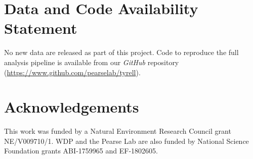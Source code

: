 \documentclass[12pt,english,a4paper]{article}
\begin{document}
\clearpage






\section*{Data and Code Availability Statement}

No new data are released as part of this project. Code to reproduce the full analysis pipeline is available from our \emph{GitHub} repository (\url{https://www.github.com/pearselab/tyrell}).


\section*{Acknowledgements}

This work was funded by a Natural Environment Research Council grant NE/V009710/1. WDP and the Pearse Lab are also funded by National Science Foundation grants ABI‐1759965 and EF‐1802605.
\end{document}

